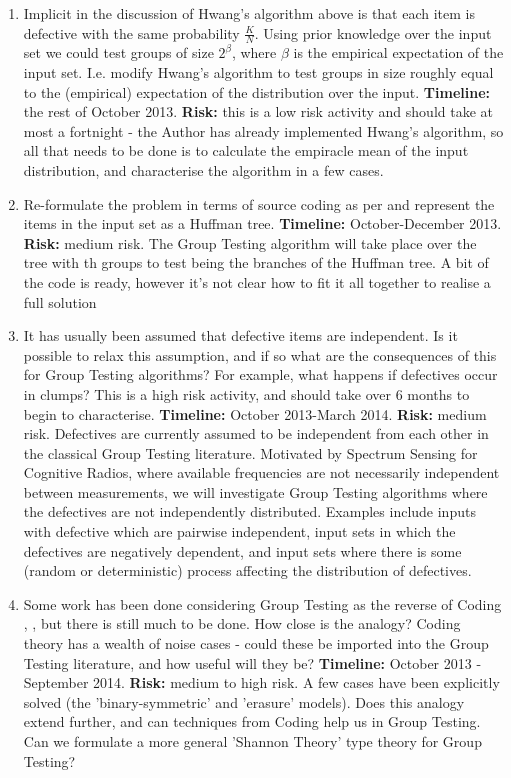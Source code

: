 \documentclass[conference]{IEEEtran}
\begin{document}
\begin{enumerate}
\item Implicit in the discussion of Hwang's algorithm above is that each item is defective with the same probability \( \frac{K}{N} \). Using prior knowledge over the input set we could test groups of size \(2^\beta\), where \(\beta\) is the empirical expectation of the input set. I.e. modify Hwang's algorithm to test groups in size roughly equal to the (empirical) expectation of the distribution over the input. \textbf{Timeline:} the rest of October 2013. \textbf{Risk: } this is a low risk activity and should take at most a fortnight - the Author has already implemented Hwang's algorithm, so all that needs to be done is to calculate the empiracle mean of the input distribution, and characterise the algorithm in a few cases.

\item Re-formulate the problem in terms of source coding as per \cite{Aldroubi} and represent the items in the input set as a Huffman tree. \textbf{Timeline:} October-December 2013. \textbf{Risk: } medium risk. The Group Testing algorithm will take place over the tree with th groups to test being the branches of the Huffman tree. A bit of the code is ready, however it's not clear how to fit it all together to realise a full solution

\item It has usually been assumed that defective items are independent. Is it possible to relax this assumption, and if so what are the consequences of this for Group Testing algorithms? For example, what happens if defectives occur in clumps? This is a high risk activity, and should take over 6 months to begin to characterise. \textbf{Timeline: }
October 2013-March 2014. \textbf{Risk: } medium risk. Defectives are currently assumed to be independent from each other in the classical Group Testing literature. Motivated by Spectrum Sensing for Cognitive Radios, where available frequencies are not necessarily independent between measurements, we will investigate Group Testing algorithms where the defectives are not independently distributed. Examples include inputs with defective which are pairwise independent, input sets in which the defectives are negatively dependent, and input sets where there is some (random or deterministic) process affecting the distribution of defectives.

\item Some work has been done considering Group Testing as the reverse of Coding \cite{Wadayama2013}, \cite{Sejdinovic2010}, but there is still much to be done. How close is the analogy? Coding theory has a wealth of noise cases - could these be imported into the Group Testing literature, and how useful will they be? \textbf{Timeline: } October 2013 - September 2014. \textbf{Risk: } medium to high risk. A few cases have been explicitly solved (the 'binary-symmetric' and 'erasure' models). Does this analogy extend further, and can techniques from Coding help us in Group Testing. Can we formulate a more general 'Shannon Theory' type theory for Group Testing?


\end{enumerate}
\end{document}

